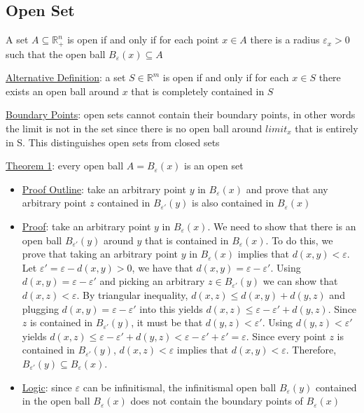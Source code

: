 \documentclass{article}
\begin{document}
\subsection{Open Set}
A set $A \subseteq \mathbb{R}_{+}^{n}$ is open if and only if for each point $x \in A$ there is a radius $\varepsilon_{x} > 0$ such that the open ball $B_{\varepsilon}(x) \subseteq A$ \par \vspace{0.3em}
  \underline{Alternative Definition}: a set $S \in \mathbb{R}^{m}$ is open if and only if for each $x \in S$ there exists an open ball around $x$ that is completely contained in $S$ \par
  \underline{Boundary Points}: open sets cannot contain their boundary points, in other words the limit is not in the set since there is no open ball around $limit_{x}$ that is entirely in S. This distinguishes open sets from closed sets \par
  \underline{Theorem 1}: every open ball $A = B_{\varepsilon}(x)$ is an open set
  \begin{itemize}
    \item  \underline{Proof Outline}: take an arbitrary point $y$ in $B_{\varepsilon}(x)$ and prove that any arbitrary point $z$ contained in $B_{\varepsilon'}(y)$ is also contained in $B_{\varepsilon}(x)$
    \item  \underline{Proof}: take an arbitrary point $y$ in $B_{\varepsilon}(x)$. We need to show that there is an open ball $B_{\varepsilon'}(y)$ around $y$ that is contained in $B_{\varepsilon}(x)$. To do this, we prove that taking an arbitrary point $y$ in $B_{\varepsilon}(x)$ implies that $d(x,y) < \varepsilon$. Let $\varepsilon' = \varepsilon - d(x,y) > 0$, we have that $d(x,y) = \varepsilon - \varepsilon'$. Using $d(x,y) = \varepsilon - \varepsilon'$ and picking an arbitrary $z \in B_{\varepsilon'}(y)$ we can show that $d(x,z) < \varepsilon$. By triangular inequality, $d(x,z) \leq d(x,y) + d(y,z)$ and plugging $d(x,y) = \varepsilon - \varepsilon'$ into this yields $d(x,z) \leq \varepsilon - \varepsilon' + d(y,z)$. Since $z$ is contained in $B_{\varepsilon'}(y)$, it must be that $d(y,z) < \varepsilon'$. Using $d(y,z) < \varepsilon'$ yields $d(x,z) \leq \varepsilon - \varepsilon' + d(y,z) < \varepsilon - \varepsilon' + \varepsilon' = \varepsilon$. Since every point $z$ is contained in $B_{\varepsilon'}(y)$, $d(x,z) < \varepsilon$ implies that $d(x,y) < \varepsilon$. Therefore, $B_{\varepsilon'}(y) \subseteq B_{\varepsilon}(x)$.
    \item  \underline{Logic}: since $\varepsilon$ can be infinitismal, the infinitismal open ball $B_{\varepsilon}(y)$ contained in the open ball $B_{\varepsilon}(x)$ does not contain the boundary points of $B_{\varepsilon}(x)$
  \end{itemize}
\end{document}
